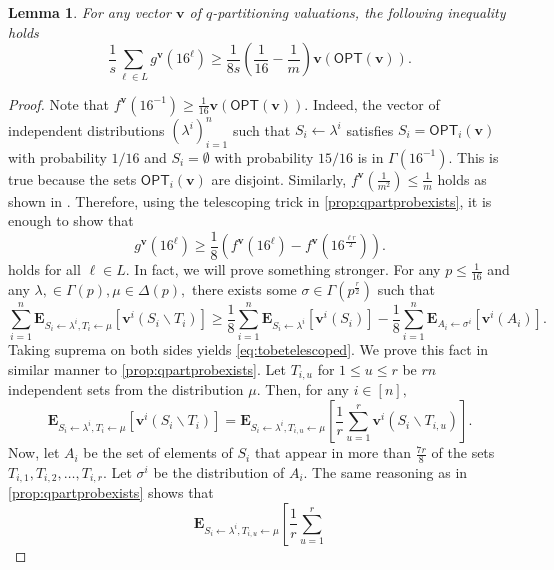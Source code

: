 \documentclass[11pt]{article}\usepackage{amsfonts}
\newtheorem{lemma}[theorem]{Lemma}
\numberwithin{theorem}{subsection}
\newcommand{\boldv}{\mathbf{v}}
\newcommand{\opt}{\mathsf{OPT}}
\newcommand{\expect}{\mathbf{E}}
\begin{document}
\begin{lemma}
\label{lem:postedpriceswithoutexpectation}
For any vector $\boldv$ of $q$-partitioning valuations, the following inequality holds
$$
\frac{1}{s}\sum_{\ell \in L}
g^\boldv(16^\ell)\ge 
\frac{1}{8s}
\left(\frac{1}{16} - \frac{1}{m}\right)
\boldv(\opt(\boldv)).
$$
\end{lemma}
\begin{proof}
Note that $f^\boldv(16^{-1})\ge \frac{1}{16}\boldv(\opt(\boldv)).$ Indeed, the vector of independent distributions $(\lambda^i)_{i=1}^n$ such that $S_i \longleftarrow \lambda^i$ satisfies $S_i = \opt_i(\boldv)$ with probability $1/16$ and $S_i = \emptyset$ with probability $15/16$ is in $\Gamma(16^{-1}).$ This is true because the sets $\opt_i(\boldv)$ are disjoint. Similarly, 
$f^\boldv(\frac{1}{m^2})\le \frac{1}{m}$ holds as shown in \cite[Lemma A.2]{DuttingKL20}. Therefore, using the telescoping trick in \cref{prop:qpartprobexists}, it is enough to show that 
\begin{equation}
\label{eq:tobetelescoped}
g^\boldv(16^\ell)\ge 
\frac{1}{8}\left(
f^\boldv(16^{\ell}) - 
f^\boldv(16^{\frac{\ell r}{2}})\right).
\end{equation}
holds for all $\ell \in L.$ In fact, we will prove something stronger. For any $p\le \frac{1}{16}$ and any $\lambda, \in \Gamma(p),\mu \in \Delta(p),$ there exists some $\sigma \in \Gamma(p^{\frac{r}{2}})$ such that 
\begin{equation}
\label{eq:onestepminimax}
\sum_{i = 1}^n 
\expect_{S_i\longleftarrow \lambda^i, T_i \longleftarrow \mu}[\boldv^i(S_i\backslash T_i)]\ge 
\frac{1}{8}\sum_{i = 1}^n 
\expect_{S_i\longleftarrow \lambda^i}[\boldv^i(S_i)] - 
\frac{1}{8}\sum_{i = 1}^n 
\expect_{A_i\longleftarrow \sigma^i}[\boldv^i(A_i)].
\end{equation}
Taking suprema on both sides yields \cref{eq:tobetelescoped}. We prove this fact in similar manner to \cref{prop:qpartprobexists}. Let $T_{i,u}$ for  $1\le u \le r$ be $rn$ independent sets from the distribution $\mu.$ Then, for any $i \in [n],$
$$
\expect_{S_i\longleftarrow \lambda^i, T_i \longleftarrow \mu}[\boldv^i(S_i\backslash T_i)] = 
\expect_{S_i\longleftarrow \lambda^i, T_{i,u} \longleftarrow \mu}\left[\frac{1}{r}\sum_{u = 1}^r
\boldv^i(S_i\backslash T_{i,u})\right].
$$
Now, let $A_i$ be the set of elements of $S_i$ that appear in more than $\frac{7r}{8}$ of the sets 
$T_{i,1}, T_{i,2}, \ldots, T_{i,r}.$ Let $\sigma^i$ be the distribution of $A_i.$ The same reasoning as in \cref{prop:qpartprobexists} shows that 
$$
\expect_{S_i\longleftarrow \lambda^i, T_{i,u} \longleftarrow \mu}\left[\frac{1}{r}\sum_{u = 1}^r
$$
\end{proof}
\end{document}
